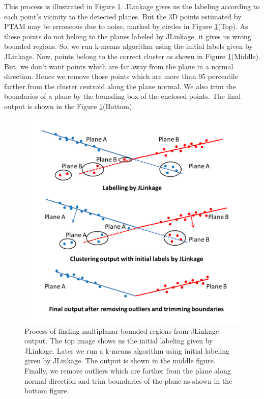 This process is illustrated in Figure \ref{fig:multiplane}. JLinkage
gives us the labeling according to each point's vicinity to the detected
planes. But the 3D points estimated by PTAM may be erroneous due to noise,
marked by circles in Figure \ref{fig:multiplane}(Top). As these points do not
belong to the planes labeled by JLinkage, it gives us wrong bounded
regions. So, we run k-means algorithm using the initial labels given by
JLinkage. Now, points  belong to the correct cluster as shown in
Figure \ref{fig:multiplane}(Middle). But, we don't want points which are far
away from the plane in a normal direction. Hence we remove those points which
are more than 95 percentile farther from the cluster centroid along the plane
normal. We also trim the boundaries of a plane by the bounding box of the
enclosed points. The final output is shown in the Figure
\ref{fig:multiplane}(Bottom).

\begin{figure}[h!]
\centering
\includegraphics[width=\linewidth]{figures/multiplanar/multiplaneDetection}
\caption[Multiple planes detection]{Process of finding multiplanar bounded
regions from JLinkage output.
The top image shows us the initial labeling given by JLinkage. Later we run a
k-means algorithm using initial labeling given by JLinkage. The output is shown
in the middle figure. Finally, we remove outliers which are farther from the
plane along normal direction and trim boundaries of the plane as shown in
the bottom figure.}
\label{fig:multiplane}
\end{figure}

